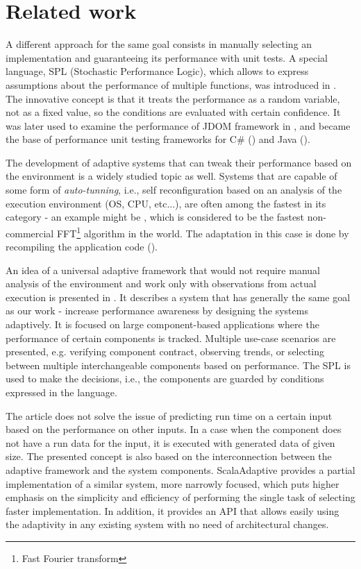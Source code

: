 \chapter{Related work}

A different approach for the same goal consists in manually selecting an implementation and guaranteeing its performance with unit tests. A special language, SPL (Stochastic Performance Logic), which allows to express assumptions about the performance of multiple functions, was introduced in \cite{bulej_capturing_2012}. The innovative concept is that it treats the performance as a random variable, not as a fixed value, so the conditions are evaluated with certain confidence. It was later used to examine the performance of JDOM framework in \cite{horky_performance_2013}, and became the base of performance unit testing frameworks for C\# (\cite{Trojanek:Thesis:2013}) and Java (\cite{Kotrc:Thesis:2015}).

The development of adaptive systems that can tweak their performance based on the environment is a widely studied topic as well. Systems that are capable of some form of \textit{auto-tunning}, i.e., self reconfiguration based on an analysis of the execution environment (OS, CPU, etc...), are often among the fastest in its category - an example might be \cite{frigo_fftw:_1998},  which is considered to be the fastest non-commercial FFT\footnote{Fast Fourier transform} algorithm in the world. The adaptation in this case is done by recompiling the application code (\cite{frigo_fast_1999}).

An idea of a universal adaptive framework that would not require manual analysis of the environment and work only with observations from actual execution is presented in \cite{bulej_performance_2012}. It describes a system that has generally the same goal as our work - increase performance awareness by designing the systems adaptively. It is focused on large component-based applications where the performance of certain components is tracked. Multiple use-case scenarios are presented, e.g. verifying component contract, observing trends, or selecting between multiple interchangeable components based on performance. The SPL is used to make the decisions, i.e., the components are guarded by conditions expressed in the language.

The article does not solve the issue of predicting run time on a certain input based on the performance on other inputs. In a case when the component does not have a run data for the input, it is executed with generated data of given size. The presented concept is also based on the interconnection between the adaptive framework and the system components. ScalaAdaptive provides a partial implementation of a similar system, more narrowly focused, which puts higher emphasis on the simplicity and efficiency of performing the single task of selecting faster implementation. In addition, it provides an API that allows easily using the adaptivity in any existing system with no need of architectural changes.


